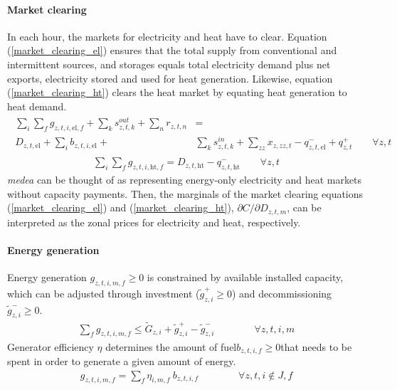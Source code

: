 \documentclass[review, 3p, times, 12pt]{elsarticle} %
\begin{document}
\paragraph{Market clearing}
In each hour, the markets for electricity and heat have to clear.
Equation (\ref{market_clearing_el}) ensures that the total supply from conventional and intermittent sources, and
storages equals total electricity demand plus net exports, electricity stored and used for heat generation.
Likewise, equation (\ref{market_clearing_ht}) clears the heat market by equating heat generation to heat demand.
\begin{align}
\begin{split}
\sum_{i}\sum_{f} g_{z,t,i,\text{el},f} + \sum_{k} s^{out}_{z,t,k} + \sum_{n} r_{z,t,n} &= \\D_{z,t,\text{el}} + \sum_{i} b_{z,t,i,\text{el}} + & \sum_{k} s^{in}_{z,t,k} + \sum_{zz} x_{z,zz,t} - q^{-}_{z,t,\text{el}} + q^{+}_{z,t} \qquad \forall z,t
\end{split}
\label{market_clearing_el}
\end{align}
\begin{align}
\sum_{i}\sum_{f} g_{z,t,i,\text{ht},f} = D_{z,t,\text{ht}} - q^{-}_{z,t,\text{ht}}\qquad \forall z,t\label{market_clearing_ht}
\end{align}
\emph{medea} can be thought of as representing energy-only electricity and heat markets without capacity payments.
Then, the marginals of the market clearing equations (\ref{market_clearing_el}) and (\ref{market_clearing_ht}),
$\partial C / \partial D_{z,t,m}$, can be interpreted as the zonal prices for electricity and heat, respectively.

\paragraph{Energy generation}
Energy generation $g_{z,t,i,m,f} \geq 0$ is constrained by available installed capacity, which can be adjusted
through investment ($\widetilde{g}^{+}_{z,i} \geq 0$) and decommissioning $\widetilde{g}^{-}_{z,i} \geq 0$.
\begin{align}
\sum_{f} g_{z,t,i,m,f}\leq \widetilde{G}_{z,i} +\widetilde{g}^{+}_{z,i} -\widetilde{g}^{-}_{z,i}\qquad \qquad \forall z,t,i,m
\end{align}
Generator efficiency $\eta$ determines the amount of fuel$b_{z,t,i,f} \geq 0$that needs to be spent in order to
generate a given amount of energy.
\begin{align}
g_{z,t,i,m,f} = \sum_{f}\eta_{i,m,f}\:b_{z,t,i,f}\qquad \qquad \forall z,t,i \notin J, f
\end{align}
\end{document}
